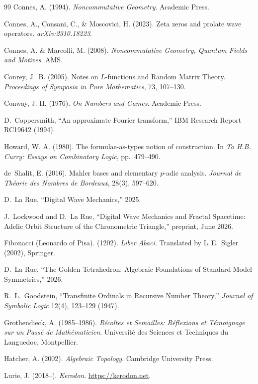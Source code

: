 \begin{thebibliography}{99}
Connes, A. (1994). \emph{Noncommutative Geometry}. Academic Press.

Connes, A., Consani, C., \& Moscovici, H. (2023). Zeta zeros and prolate wave operators. \emph{arXiv:2310.18223}.

Connes, A. \& Marcolli, M. (2008). \emph{Noncommutative Geometry, Quantum Fields and Motives}. AMS.

Conrey, J.~B. (2005).
Notes on $L$-functions and Random Matrix Theory.
\emph{Proceedings of Symposia in Pure Mathematics}, 73, 107--130.

Conway, J. H. (1976). \emph{On Numbers and Games}. Academic Press.

D.~Coppersmith,
``An approximate Fourier transform,''
IBM Research Report RC19642 (1994).

Howard, W. A. (1980). The formulae-as-types notion of construction. In \emph{To H.B. Curry: Essays on Combinatory Logic}, pp.~479--490.

de~Shalit, E. (2016).
Mahler bases and elementary $p$-adic analysis.
\emph{Journal de Th\'eorie des Nombres de Bordeaux}, 28(3), 597--620.

D.~La Rue,
``Digital Wave Mechanics,'' 2025.

J.~Lockwood and D.~La Rue, ``Digital Wave Mechanics and Fractal Spacetime: Adelic Orbit Structure of the Chronometric Triangle,'' preprint, June 2026.

Fibonacci (Leonardo of Pisa). (1202). \emph{Liber Abaci}. Translated by L.\,E.\ Sigler (2002), Springer.

D.~La Rue,
``The Golden Tetrahedron: Algebraic Foundations of Standard Model Symmetries,''
2026.

R.~L.~Goodstein,
``Transfinite Ordinals in Recursive Number Theory,''
\emph{Journal of Symbolic Logic} 12(4), 123--129 (1947).

Grothendieck, A. (1985--1986). \emph{R\'ecoltes et Semailles: R\'eflexions et T\'emoignage sur un Pass\'e de Math\'ematicien}. Universit\'e des Sciences et Techniques du Languedoc, Montpellier.

Hatcher, A. (2002). \emph{Algebraic Topology}. Cambridge University Press.

Lurie, J. (2018--). \emph{Kerodon}. \url{https://kerodon.net}.


\end{thebibliography}
